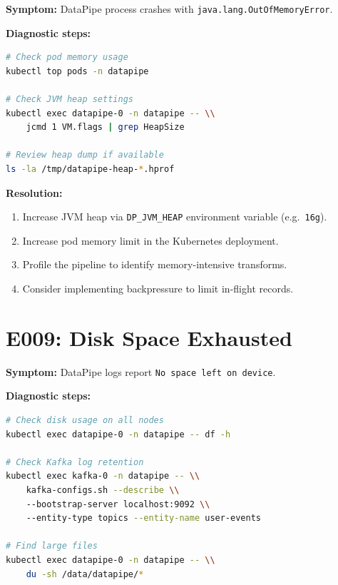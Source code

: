 \documentclass[
    language=english,
    doctype=manual,
    institution=none,
    titlestyle=book,
    oneside,
]{../../omnilatex}
\begin{document}
\textbf{Symptom:} DataPipe process crashes with
\texttt{java.lang.OutOfMemoryError}.

\textbf{Diagnostic steps:}

\begin{lstlisting}[language=bash]
# Check pod memory usage
kubectl top pods -n datapipe

# Check JVM heap settings
kubectl exec datapipe-0 -n datapipe -- \\
    jcmd 1 VM.flags | grep HeapSize

# Review heap dump if available
ls -la /tmp/datapipe-heap-*.hprof
\end{lstlisting}

\textbf{Resolution:}

\begin{enumerate}
    \item Increase JVM heap via \texttt{DP\_JVM\_HEAP} environment
        variable (e.g.\ \texttt{16g}).
    \item Increase pod memory limit in the Kubernetes deployment.
    \item Profile the pipeline to identify memory-intensive transforms.
    \item Consider implementing backpressure to limit in-flight records.
\end{enumerate}

\section{E009: Disk Space Exhausted}
\label{sec:e009}

\textbf{Symptom:} DataPipe logs report \texttt{No space left on device}.

\textbf{Diagnostic steps:}

\begin{lstlisting}[language=bash]
# Check disk usage on all nodes
kubectl exec datapipe-0 -n datapipe -- df -h

# Check Kafka log retention
kubectl exec kafka-0 -n datapipe -- \\
    kafka-configs.sh --describe \\
    --bootstrap-server localhost:9092 \\
    --entity-type topics --entity-name user-events

# Find large files
kubectl exec datapipe-0 -n datapipe -- \\
    du -sh /data/datapipe/*
\end{lstlisting}
\end{document}
